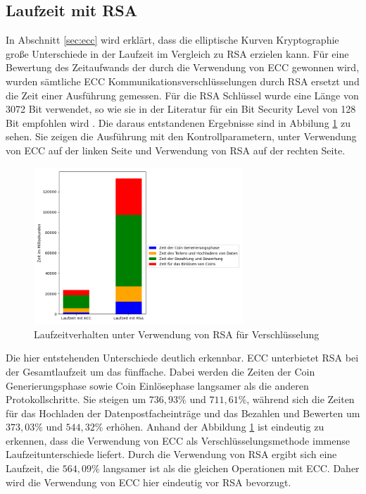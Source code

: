 \documentclass[
	fontsize=11pt,
	headings=small,
	parskip=half,           %
	bibliography=totoc,
	numbers=noenddot,       %
	open=any,               %
]{scrreprt}
\begin{document}
\subsection{Laufzeit mit RSA}
\label{subsec:runTimeRSA}
In Abschnitt \ref{sec:ecc} wird erklärt, dass die elliptische Kurven Kryptographie große Unterschiede in der Laufzeit im Vergleich zu RSA erzielen kann. Für eine Bewertung des Zeitaufwands der durch die Verwendung von ECC gewonnen wird, wurden sämtliche ECC Kommunikationsverschlüsselungen durch RSA ersetzt und die Zeit einer Ausführung gemessen. Für die RSA Schlüssel wurde eine Länge von 3072 Bit verwendet, so wie sie in der Literatur für ein Bit Security Level von 128 Bit empfohlen wird \cite{elaine2016recommendation}. Die daraus entstandenen Ergebnisse sind in Abbilung \ref{fig:win_rsa} zu sehen. Sie zeigen die Ausführung mit den Kontrollparametern, unter Verwendung von ECC auf der linken Seite und Verwendung von RSA auf der rechten Seite. 

\begin{figure}[h]
    \caption{Laufzeitverhalten unter Verwendung von RSA für Verschlüsselung}
    \label{fig:win_rsa}
    \centering
    \includegraphics[width=0.7\textwidth]{figure_win_RSA.png}
\end{figure}
Die hier entstehenden Unterschiede deutlich erkennbar. ECC unterbietet RSA bei der Gesamtlaufzeit um das fünffache. Dabei werden die Zeiten der Coin Generierungsphase sowie Coin Einlösephase langsamer als die anderen Protokollschritte. Sie steigen um $736,93\%$ und $711,61\%$, während sich die Zeiten für das Hochladen der Datenpostfacheinträge und das Bezahlen und Bewerten um $373,03\%$ und $544,32\%$ erhöhen. Anhand der Abbildung \ref{fig:win_rsa} ist eindeutig zu erkennen, dass die Verwendung von ECC als Verschlüsselungsmethode immense Laufzeitunterschiede liefert. Durch die Verwendung von RSA ergibt sich eine Laufzeit, die $564,09\%$ langsamer ist als die gleichen Operationen mit ECC. Daher wird die Verwendung von ECC hier eindeutig vor RSA bevorzugt.
\end{document}
